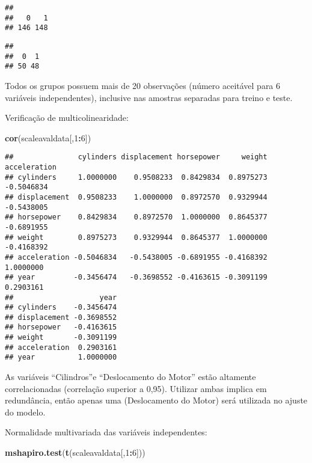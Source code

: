 \documentclass[]{article}
\newenvironment{Shaded}{\begin{snugshade}}{\end{snugshade}}
\newcommand{\KeywordTok}[1]{\textcolor[rgb]{0.13,0.29,0.53}{\textbf{#1}}}
\newcommand{\DecValTok}[1]{\textcolor[rgb]{0.00,0.00,0.81}{#1}}
\newcommand{\OperatorTok}[1]{\textcolor[rgb]{0.81,0.36,0.00}{\textbf{#1}}}
\newcommand{\NormalTok}[1]{#1}
\begin{document}
\begin{verbatim}
## 
##   0   1 
## 146 148
\end{verbatim}

\begin{Shaded}
\end{Shaded}

\begin{verbatim}
## 
##  0  1 
## 50 48
\end{verbatim}

Todos os grupos possuem mais de 20 observações (número aceitável para 6
variáveis independentes), inclusive nas amostras separadas para treino e
teste.

Verificação de multicolinearidade:

\begin{Shaded}
\begin{Highlighting}[]
\KeywordTok{cor}\NormalTok{(scaleavaldata[,}\DecValTok{1}\OperatorTok{:}\DecValTok{6}\NormalTok{])}
\end{Highlighting}
\end{Shaded}

\begin{verbatim}
##               cylinders displacement horsepower     weight acceleration
## cylinders     1.0000000    0.9508233  0.8429834  0.8975273   -0.5046834
## displacement  0.9508233    1.0000000  0.8972570  0.9329944   -0.5438005
## horsepower    0.8429834    0.8972570  1.0000000  0.8645377   -0.6891955
## weight        0.8975273    0.9329944  0.8645377  1.0000000   -0.4168392
## acceleration -0.5046834   -0.5438005 -0.6891955 -0.4168392    1.0000000
## year         -0.3456474   -0.3698552 -0.4163615 -0.3091199    0.2903161
##                    year
## cylinders    -0.3456474
## displacement -0.3698552
## horsepower   -0.4163615
## weight       -0.3091199
## acceleration  0.2903161
## year          1.0000000
\end{verbatim}

As variáveis ``Cilindros''e ``Deslocamento do Motor'' estão altamente
correlacionadas (correlação superior a 0,95). Utilizar ambas implica em
redundância, então apenas uma (Deslocamento do Motor) será utilizada no
ajuste do modelo.

Normalidade multivariada das variáveis independentes:

\begin{Shaded}
\begin{Highlighting}[]
\KeywordTok{mshapiro.test}\NormalTok{(}\KeywordTok{t}\NormalTok{(scaleavaldata[,}\DecValTok{1}\OperatorTok{:}\DecValTok{6}\NormalTok{]))}
\end{Highlighting}
\end{Shaded}
\end{document}
